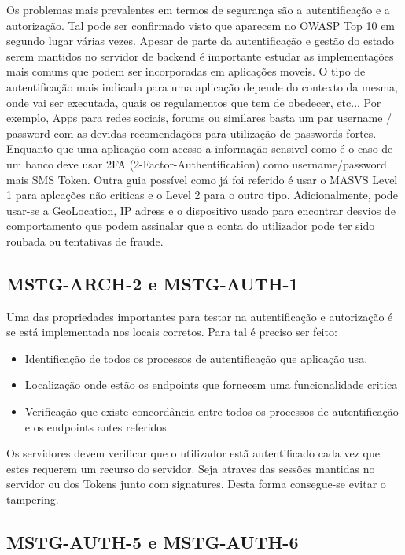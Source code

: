 	Os problemas mais prevalentes em termos de segurança são a autentificação e a autorização. Tal pode ser confirmado visto que aparecem no OWASP Top 10 \cite{ref_intro8} em segundo lugar várias vezes.
	Apesar de parte da autentificação e gestão do estado serem mantidos no servidor de backend é importante estudar as implementações mais comuns que podem ser incorporadas em aplicações moveis.
	O tipo de autentificação mais indicada para uma aplicação depende do contexto da mesma, onde vai ser executada, quais os regulamentos que tem de obedecer, etc... Por exemplo, Apps para redes sociais, forums ou similares basta um par username / password com as devidas recomendações para utilização de passwords fortes. Enquanto que uma aplicação com acesso a informação sensivel como é o caso de um banco deve usar 2FA (2-Factor-Authentification) como username/password mais SMS Token. Outra guia possível como já foi referido é usar o MASVS Level 1 para aplcações não criticas e o Level 2 para o outro tipo.
Adicionalmente, pode usar-se a GeoLocation, IP adress e o dispositivo usado para encontrar desvios de comportamento que podem assinalar que a conta do utilizador pode ter sido roubada ou tentativas de fraude.

\subsection{MSTG-ARCH-2 e MSTG-AUTH-1}

Uma das propriedades importantes para testar na autentificação e autorização é se está implementada nos locais corretos. Para tal é preciso ser feito:

\begin{itemize}

\item Identificação de todos os processos de autentificação que aplicação usa.
\item Localização onde estão os endpoints que fornecem uma funcionalidade critica
\item Verificação que existe concordância entre todos os processos de autentificação e os endpoints antes referidos

\end{itemize}

Os servidores devem verificar que o utilizador estã autentificado cada vez que estes requerem um recurso do servidor. Seja atraves das sessões mantidas no servidor ou dos Tokens junto com signatures. Desta forma consegue-se evitar o tampering.

\subsection{MSTG-AUTH-5 e MSTG-AUTH-6}

